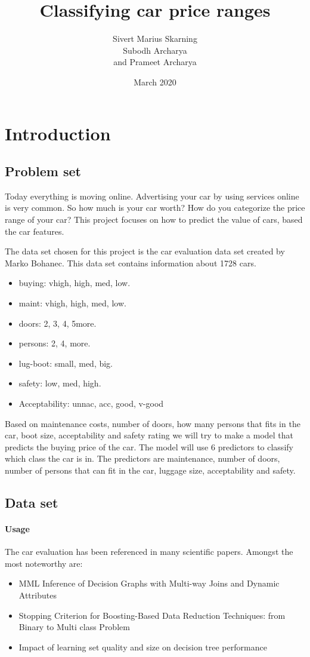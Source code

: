 \documentclass[a4paper, 12pt]{article}
\title{Classifying car price ranges}
\author{Sivert Marius Skarning\\Subodh Archarya\\and Prameet Archarya}
\date{March 2020}
\begin{document}
\maketitle
\clearpage
\tableofcontents
\clearpage

\section{Introduction}
\subsection{Problem set}
Today everything is moving online. Advertising your car by using services online is very common. So how much is your car worth? How do you categorize the price range of your car? This project focuses on how to predict the value of cars, based the car features.

The data set chosen for this project is the car evaluation data set created by Marko Bohanec. This data set contains information about 1728 cars.

\begin{itemize}
  \item buying: vhigh, high, med, low.
  \item maint: vhigh, high, med, low.
  \item doors: 2, 3, 4, 5more.
  \item persons: 2, 4, more.
  \item lug-boot: small, med, big.
  \item safety: low, med, high.
  \item Acceptability: unnac, acc, good, v-good
\end{itemize}

Based on maintenance costs, number of doors, how many persons that fits in the car, boot size, acceptability and safety rating we will try to make a model that predicts the buying price of the car. The model will use 6 predictors to classify which class the car is in. The predictors are maintenance, number of doors, number of persons that can fit in the car, luggage size, acceptability and safety.


\subsection{Data set}
\paragraph{Usage}
The car evaluation has been referenced in many scientific papers. Amongst the most noteworthy are:
\begin{itemize}
\item MML Inference of Decision Graphs with Multi-way Joins and Dynamic Attributes \cite{mml-interference}
\item Stopping Criterion for Boosting-Based Data Reduction Techniques: from Binary to Multi class Problem \cite{boosting}
\item Impact of learning set quality and size on decision tree performance \cite{learning-set}
\end{itemize}
\end{document}
